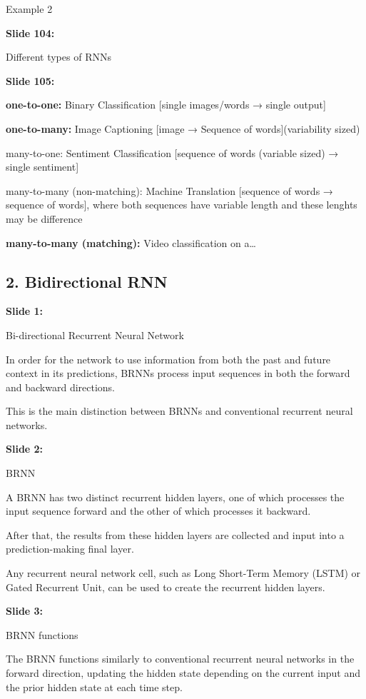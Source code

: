 \documentclass[11pt,a4paper]{article}
\begin{document}
Example 2

\textbf{Slide 104:}

Different types of RNNs

\textbf{Slide 105:}

\textbf{one-to-one:}  Binary Classification [single images/words → single output]

\textbf{one-to-many:}  Image Captioning [image → Sequence of words](variability sized)

many-to-one: Sentiment Classification [sequence of words (variable sized) → single sentiment]

many-to-many (non-matching): Machine Translation [sequence of words → sequence of words], where both sequences have variable length and these lenghts may be difference

\textbf{many-to-many (matching):}  Video classification on a…


\subsection{2. Bidirectional RNN}

\textbf{Slide 1:}

Bi-directional Recurrent Neural Network

In order for the network to use information from both the past and future context in its predictions, BRNNs process input sequences in both the forward and backward directions.

This is the main distinction between BRNNs and conventional recurrent neural networks.

\textbf{Slide 2:}

BRNN

A BRNN has two distinct recurrent hidden layers, one of which processes the input sequence forward and the other of which processes it backward.

After that, the results from these hidden layers are collected and input into a prediction-making final layer.

Any recurrent neural network cell, such as Long Short-Term Memory (LSTM) or Gated Recurrent Unit, can be used to create the recurrent hidden layers.

\textbf{Slide 3:}

BRNN functions

The BRNN functions similarly to conventional recurrent neural networks in the forward direction, updating the hidden state depending on the current input and the prior hidden state at each time step.
\end{document}
